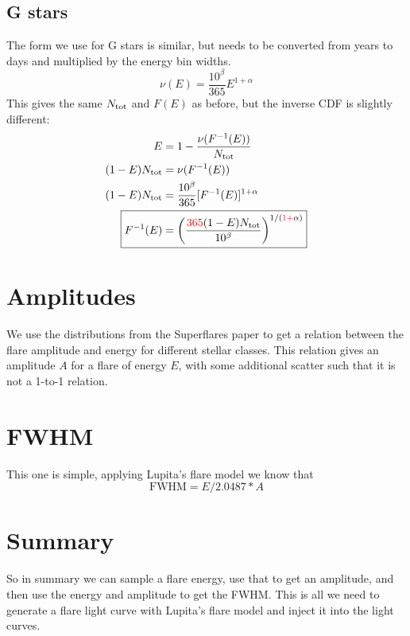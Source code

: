 \documentclass[10pt]{article}
\begin{document}
\subsection{G stars}
The form we use for G stars is similar, but needs to be converted from years to days and multiplied by the energy bin widths.
\begin{equation}
    \nu(E) = \frac{10^\beta}{365} E^{1 + \alpha}
\end{equation}
This gives the same $N_{\rm tot}$ and $F(E)$ as before, but the inverse CDF is slightly different:
\begin{align}
    E &= 1 - \frac{\nu(F^{-1}(E))}{N_{\rm tot}} \\
    (1 - E) N_{\rm tot} &= \nu(F^{-1}(E)) \\
    (1 - E) N_{\rm tot} &= \frac{10^{\beta}}{365} [F^{-1}(E)]^{1 + \alpha} \\
    \Aboxed{ F^{-1}(E) &= \qty(\frac{{\color{red}365} (1 - E) N_{\rm tot}}{10^{\beta}})^{1/({\color{red}1 + } \alpha)} }
\end{align}

\section{Amplitudes}

We use the distributions from the Superflares paper to get a relation between the flare amplitude and energy for different stellar classes. This relation gives an amplitude $A$ for a flare of energy $E$, with some additional scatter such that it is not a 1-to-1 relation.

\section{FWHM}

This one is simple, applying Lupita's flare model we know that
\begin{equation}
    \text{FWHM} = E / 2.0487 * A 
\end{equation}

\section{Summary}

So in summary we can sample a flare energy, use that to get an amplitude, and then use the energy and amplitude to get the FWHM. This is all we need to generate a flare light curve with Lupita's flare model and inject it into the light curves.
\end{document}
